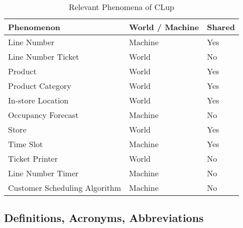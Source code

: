 \begin{table}[H]
    \begin{tabular}{|p{4cm}|p{4cm}|p{4cm}|}
        \hline
        \textbf{Phenomenon}    & \textbf{World / Machine}       & \textbf{Shared } \\ \hline
        Line Number & Machine & Yes \\ \hline
        Line Number Ticket & World & No \\ \hline
        Product & World & Yes \\ \hline
        Product Category & World & Yes \\ \hline
        In-store Location & World & Yes \\ \hline
        Occupancy Forecast & Machine & No \\ \hline
        Store & World & Yes \\ \hline
        Time Slot & Machine & Yes \\ \hline
        Ticket Printer & World & No \\ \hline
        Line Number Timer & Machine & No \\ \hline
        Customer Scheduling Algorithm & Machine & No \\ \hline

    \end{tabular}
    \caption{Relevant Phenomena of CLup}
\end{table}



\subsection{Definitions, Acronyms, Abbreviations}
